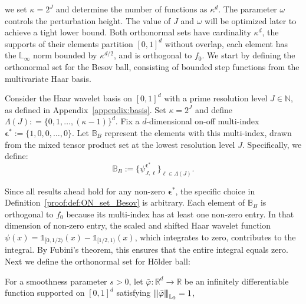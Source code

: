 \documentclass[twoside,11pt]{article}
\newcommand{\Ell}{\mathbb{L}}
\newcommand{\normEllp}[3]{
	\vertiii{#1}_{\Ell_{#2}}^{#3}
}
\newcommand{\vertiii}[1]{
	{\left\vert\kern-0.25ex\left\vert\kern-0.25ex\left\vert #1 
		\right\vert\kern-0.25ex\right\vert\kern-0.25ex\right\vert}
}%
\newcommand{\vectorize}[1]{\mathbf{#1}}
\newcommand{\dimDensity}{d} %
\newcommand{\ONset}{\mathbb{B}}
\newcommand{\binNum}{\kappa}           %
\newcommand{\wavMotherFunc}{\psi} %
\newcommand{\primResLev}{J}
\newcommand{\wavMotherUnivIndex}{\ell}
\newcommand{\wavMotherIndex}{\boldsymbol{\wavMotherUnivIndex}}
\newcommand{\wavMotherBooleanUnivIndex}{\epsilon}
\newcommand{\wavMotherBooleanIndex}{\mathbf{\wavMotherBooleanUnivIndex}}
\begin{document}
\begin{appendix}
	we set \( \binNum = 2^\primResLev \)
	and determine the number of functions as $\binNum^\dimDensity$.
	The parameter  $\omega$ controls the perturbation height.
	The value of $\primResLev$ and $\omega$ will be optimized later to achieve a tight lower bound.
	Both orthonormal sets have cardinality $\binNum^{\dimDensity}$,
	the supports of their elements partition $[0,1]^d$ without overlap, each element has the $\Ell_\infty$ norm bounded by $\binNum^{\dimDensity/2}$,
	and is orthogonal to $f_0$. We start by defining the orthonormal set for the Besov ball, consisting of bounded step functions from the multivariate Haar basis.
	\begin{definition}\label{proof:def:ON_set_Besov}
		Consider the Haar wavelet basis on $[0,1]^\dimDensity$ with a prime resolution level $\primResLev \in \mathbb{N}$, as defined in Appendix~\ref{appendix:basis}.
		Set \( \binNum = 2^\primResLev \) and define
		$ \Lambda(\primResLev): = \{0, 1, \dots, (\binNum - 1)\}^\dimDensity $.
		Fix a $\dimDensity$-dimensional on-off multi-index \(\vectorize{\epsilon}^\ast := \{1,0,0,\ldots, 0\}\). Let \(\ONset_{B}\) represent the elements with this multi-index, drawn from the mixed tensor product set at the lowest resolution level \(\primResLev\). Specifically, we define:
		\begin{equation*}
			\ONset_{B}:=\{
			\wavMotherFunc_{\primResLev, \wavMotherIndex}^{\wavMotherBooleanIndex^\ast}
			\}_{
				\wavMotherIndex \in \Lambda(\primResLev)
			}.
		\end{equation*}
	\end{definition}
	\noindent
	Since all results ahead hold for any non-zero \(\vectorize{\epsilon}^\ast\), the specific choice in Definition~\ref{proof:def:ON_set_Besov} is arbitrary.
	Each element of \( \ONset_{B} \) is orthogonal to \( f_0 \) because its multi-index has at least one non-zero entry. In that dimension of non-zero entry, the scaled and shifted Haar wavelet function \( \wavMotherFunc(x) = \mathds{1}_{[0, 1/2)}(x) - \mathds{1}_{[1/2, 1)}(x) \), which integrates to zero, contributes to the integral. By Fubini's theorem, this ensures that the entire integral equals zero.
	Next we define the orthonormal set for H\"{o}lder ball:
	\begin{definition}\label{proof:def:ON_set_Holder}
		For a smoothness parameter \( s > 0 \), let \( \bar{\varphi}: \mathbb{R}^d \to \mathbb{R} \) be an infinitely differentiable function supported on $[0,1]^d$ satisfying
		$\normEllp{\bar{\varphi}}{2}{}=1$,

\end{definition}
\end{appendix}
\end{document}
